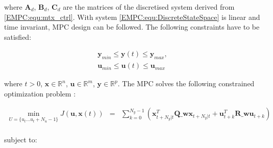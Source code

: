     where $\textbf{A}_d$, $\textbf{B}_d$, $\textbf{C}_d$ are the matrices of the discretised system derived from \ref{EMPC:equ:mtx_ctrl}. With system \ref{EMPC:equ:DiscreteStateSpace} is linear and time invariant, MPC design can be followed. The following constraints have to be satisfied:

    \begin{equation}
        \begin{array}{r}
            \textbf{y}_{min}\leq\textbf{y}(t)\leq\textbf{y}_{max},\\
            \textbf{u}_{min}\leq\textbf{u}(t)\leq\textbf{u}_{max}
        \end{array}
        \label{EMPC:equ:contraint_desc}
    \end{equation}

    where $t>0$, $\textbf{x}\in \mathbb{R}^n$, $\textbf{u}\in \mathbb{R}^m$, $\textbf{y}\in \mathbb{R}^p$. The MPC solves the following constrained optimization problem \cite{rivera2013predictive}:

    \begin{equation}
        \begin{array}{rcl}
           \displaystyle \min_{U=\{u_t\dots u_t+N_u-1\}}J(\textbf{u},\textbf{x}(t))&=&\sum^{N_y-1}_{k=0}(\textbf{x}^T_{t+N_y|t}\textbf{Q_w}\textbf{x}_{t+N_y|t}+
           \textbf{u}^T_{t+k}\textbf{R_w}\textbf{u}_{t+k})\\
        \end{array}
        \label{EMPC:equ:optim_problem}
    \end{equation}

    subject to:

